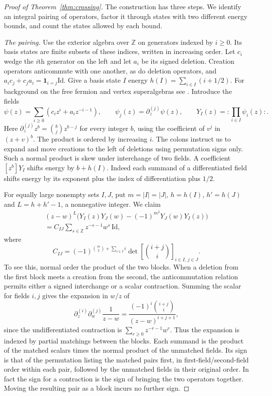 \begin{proof}[Proof of Theorem~\ref{thm:crossing}]
The construction has three steps. We identify an integral pairing
of operators, factor it through states with two different energy
bounds, and count the states allowed by each bound.

\smallskip\noindent\emph{The pairing.}
Use the exterior algebra over $\mathbb Z$ on generators indexed by
$i\ge 0$. Its basis states are finite subsets of these indices,
written in increasing order. Let $c_i$ wedge the $i$th generator on
the left and let $a_i$ be its signed deletion. Creation operators
anticommute with one another, as do deletion operators, and
$a_i c_j+c_j a_i=\mathbf 1_{i=j}\mathrm{Id}$. Give a basis state $I$
energy $h(I)=\sum_{i\in I}(i+1/2)$. For background on the free fermion and vertex superalgebras see \cite{KacWang}. Introduce the fields
\[
 \psi(z)=\sum_{i\ge0}(c_i z^i+a_i z^{-i-1}),
 \qquad \psi_j(z)=\partial^{(j)}_z\psi(z),
 \qquad Y_I(z)={:}\prod_{i\in I}\psi_i(z){:}.
\]
Here $\partial^{(j)}_z z^b=\binom bj z^{b-j}$ for every integer $b$,
using the coefficient of $v^j$ in $(z+v)^b$. The product is ordered
by increasing $i$. The colons instruct us to expand and move creations
to the left of deletions using permutation signs only. Such a normal
product is skew under interchange of two fields. A coefficient $[z^b]Y_I$
shifts energy by $b+h(I)$. Indeed each summand of a differentiated
field shifts energy by its exponent plus the index of differentiation
plus $1/2$.

For equally large nonempty sets $I,J$, put $m=|I|=|J|$, $h=h(I)$,
$h'=h(J)$ and $L=h+h'-1$, a nonnegative integer. We claim
\begin{multline}\label{eq:crossing-field}
 (z-w)^L\big(Y_I(z)Y_J(w)-(-1)^{m^2}Y_J(w)Y_I(z)\big)
   \\= C_{IJ}\sum_{s\in\mathbb Z}z^{-s-1}w^s\,\mathrm{Id},
\end{multline}
where
\[
 C_{IJ}=(-1)^{\binom m2+\sum_{i\in I}i}
       \det\left[\binom{i+j}{i}\right]_{i\in I,\,j\in J}.
\]
To see this, normal order the product of the two blocks. When a
deletion from the first block meets a creation from the second, the
anticommutation relation permits either a signed interchange or a
scalar contraction. Summing the scalar for fields $i,j$ gives the
expansion in $w/z$ of
\[
  \partial^{(i)}_z\partial^{(j)}_w\frac{1}{z-w}
   =\frac{(-1)^i\binom{i+j}{i}}{(z-w)^{i+j+1}},
\]
since the undifferentiated contraction is
$\sum_{r\ge0}z^{-r-1}w^r$. Thus the expansion is indexed by partial
matchings between the blocks. Each summand is the product of the
matched scalars times the normal product of the unmatched fields.
Its sign is that of the permutation listing the matched pairs first,
in first-field/second-field order within each pair, followed by the
unmatched fields in their original order. In fact the sign for a
contraction is the sign of bringing the two operators together.
Moving the resulting pair as a block incurs no further sign.


\end{proof}
